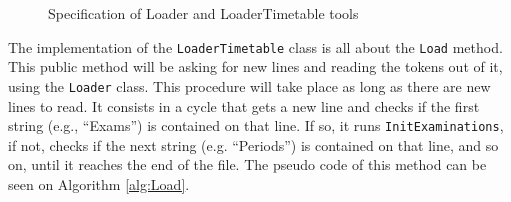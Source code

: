 \begin{figure}[t!]
\centering
{}

\caption{Specification of Loader and LoaderTimetable tools} \label{fig:Loaders}
\end{figure}The implementation of the \verb+LoaderTimetable+ class is all about the \verb+Load+ method. This public method will be asking for new lines and reading the tokens out of it, using the \verb+Loader+ class. This procedure will take place as long as there are new lines to read. It consists in a cycle that gets a new line and checks if the first string (e.g., ``Exams'') is contained on that line. If so, it runs \verb+InitExaminations+, if not, checks if the next string (e.g. ``Periods'') is contained on that line, and so on, until it reaches the end of the file. The pseudo code of this method can be seen on Algorithm \ref{alg:Load}.\\
\\
